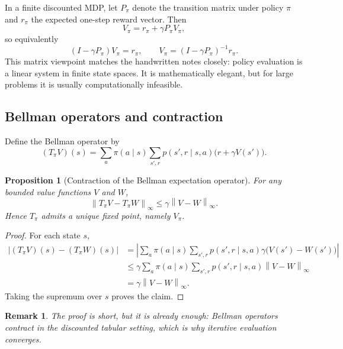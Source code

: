 \documentclass[11pt]{article}
\newtheorem{proposition}{Proposition}
\newtheorem{remark}{Remark}
\newcommand{\1}{\mathbf{1}}
\newcommand{\norm}[1]{\left\lVert #1 \right\rVert}
\begin{document}
In a finite discounted MDP, let $P_\pi$ denote the transition matrix under policy $\pi$ and $r_\pi$ the expected one-step reward vector. Then
\begin{equation}
V_\pi=r_\pi+\gamma P_\pi V_\pi,
\end{equation}
so equivalently
\begin{equation}
(I-\gamma P_\pi)V_\pi=r_\pi,
\qquad
V_\pi=(I-\gamma P_\pi)^{-1}r_\pi.
\end{equation}
This matrix viewpoint matches the handwritten notes closely: policy evaluation is a linear system in finite state spaces. It is mathematically elegant, but for large problems it is usually computationally infeasible.

\subsection{Bellman operators and contraction}

Define the Bellman operator by
\begin{equation}
(T_\pi V)(s)=\sum_a \pi(a\mid s)\sum_{s',r} p(s',r\mid s,a)\bigl(r+\gamma V(s')\bigr).
\end{equation}

\begin{proposition}[Contraction of the Bellman expectation operator]
For any bounded value functions $V$ and $W$,
\begin{equation}
\norm{T_\pi V-T_\pi W}_\infty \le \gamma \norm{V-W}_\infty.
\end{equation}
Hence $T_\pi$ admits a unique fixed point, namely $V_\pi$.
\end{proposition}

\begin{proof}
For each state $s$,
\begin{align*}
\bigl|(T_\pi V)(s)-(T_\pi W)(s)\bigr|
&= \left|\sum_a\pi(a\mid s)\sum_{s',r}p(s',r\mid s,a)\gamma\bigl(V(s')-W(s')\bigr)\right| \\
&\le \gamma\sum_a\pi(a\mid s)\sum_{s',r}p(s',r\mid s,a)\norm{V-W}_\infty \\
&= \gamma\norm{V-W}_\infty.
\end{align*}
Taking the supremum over $s$ proves the claim.
\end{proof}

\begin{remark}
The proof is short, but it is already enough: Bellman operators contract in the discounted tabular setting, which is why iterative evaluation converges.
\end{remark}
\end{document}
